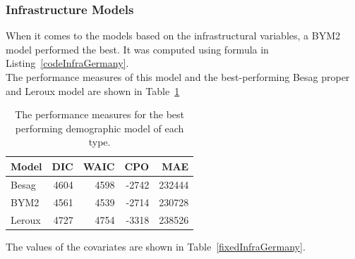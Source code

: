 \subsubsection{Infrastructure Models}
When it comes to the models based on the infrastructural variables, a BYM2 model performed the best. It was computed using formula in Listing~\ref{codeInfraGermany}. \\
The performance measures of this model and the best-performing Besag proper and Leroux model are shown in Table~\ref{infraGermany}
\begin{table}[H] 
\caption{The performance measures for the best performing demographic model of each type. \label{infraGermany}}
\begin{tabular}{l r r r r}
\toprule
\textbf{Model}	& \textbf{DIC}	& \textbf{WAIC} & \textbf{CPO} & \textbf{MAE}\\
\midrule
Besag & 4604 & 4598 & -2742 & 232444\\
BYM2 & 4561 & 4539 & -2714 & 230728\\
Leroux & 4727 & 4754 & -3318 & 238526\\
\bottomrule
\end{tabular}
\end{table}
The values of the covariates are shown in Table~\ref{fixedInfraGermany}.
